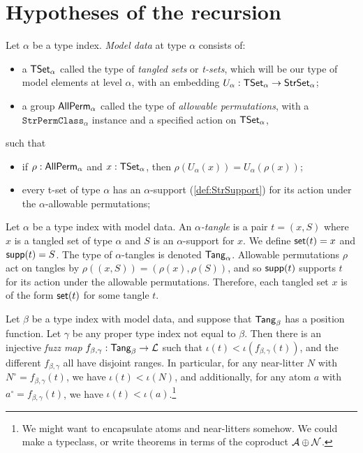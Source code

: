 \section{Hypotheses of the recursion}
\begin{definition}
  \label{def:ModelData}
  Let \( \alpha \) be a type index.
  \emph{Model data} at type \( \alpha \) consists of:
  \begin{itemize}
    \item a \( \mathsf{TSet}_\alpha \) called the type of \emph{tangled sets} or \emph{t-sets}, which will be our type of model elements at level \( \alpha \), with an embedding \( U_\alpha : \mathsf{TSet}_\alpha \to \mathsf{StrSet}_\alpha \);
    \item a group \( \mathsf{AllPerm}_\alpha \) called the type of \emph{allowable permutations}, with a \( \texttt{StrPermClass}_\alpha \) instance and a specified action on \( \mathsf{TSet}_\alpha \),
  \end{itemize}
  such that
  \begin{itemize}
    \item if \( \rho : \mathsf{AllPerm}_\alpha \) and \( x : \mathsf{TSet}_\alpha \), then \( \rho(U_\alpha(x)) = U_\alpha(\rho(x)) \);
    \item every t-set of type \( \alpha \) has an \( \alpha \)-support (\cref{def:StrSupport}) for its action under the \( \alpha \)-allowable permutations;
  \end{itemize}
\end{definition}
\begin{definition}[tangle]
  \label{def:Tangle}
  Let \( \alpha \) be a type index with model data.
  An \emph{\( \alpha \)-tangle} is a pair \( t = (x, S) \) where \( x \) is a tangled set of type \( \alpha \) and \( S \) is an \( \alpha \)-support for \( x \).
  We define \( \operatorname{\mathsf{set}}(t) = x \) and \( \operatorname{\mathsf{supp}}(t) = S \).
  The type of \( \alpha \)-tangles is denoted \( \mathsf{Tang}_\alpha \).
  Allowable permutations \( \rho \) act on tangles by \( \rho((x, S)) = (\rho(x), \rho(S)) \), and so \( \operatorname{\mathsf{supp}}(t) \) supports \( t \) for its action under the allowable permutations.
  Therefore, each tangled set \( x \) is of the form \( \operatorname{\mathsf{set}}(t) \) for some tangle \( t \).
\end{definition}
\begin{proposition}
  \label{prop:fuzz}
  Let \( \beta \) be a type index with model data, and suppose that \( \mathsf{Tang}_\beta \) has a position function.
  Let \( \gamma \) be any proper type index not equal to \( \beta \).
  Then there is an injective \emph{fuzz map} \( f_{\beta,\gamma} : \mathsf{Tang}_\beta \to {\mathcal L} \) such that \( \iota(t) < \iota(f_{\beta,\gamma}(t)) \), and the different \( f_{\beta,\gamma} \) all have disjoint ranges.
  In particular, for any near-litter \( N \) with \( N^\circ = f_{\beta,\gamma}(t) \), we have \( \iota(t) < \iota(N) \), and additionally, for any atom \( a \) with \( a^\circ = f_{\beta,\gamma}(t) \), we have \( \iota(t) < \iota(a) \).\footnote{We might want to encapsulate atoms and near-litters somehow. We could make a typeclass, or write theorems in terms of the coproduct \( {\mathcal A} \oplus {\mathcal N} \).}
\end{proposition}
